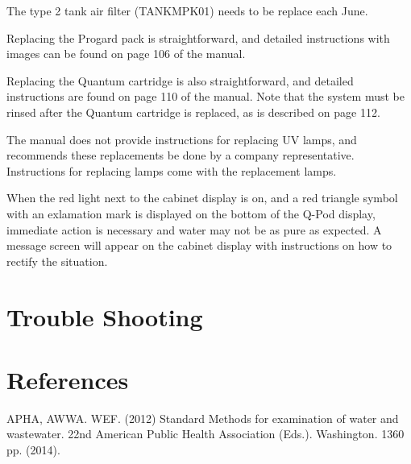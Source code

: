 \documentclass[12pt]{../SOP3_beta}\usepackage[]{graphicx}\usepackage[]{color}
\begin{document}
\NP The type 2 tank air filter (TANKMPK01) needs to be replace each June. 

\NP Replacing the Progard pack is straightforward, and detailed instructions with images can be found on page 106 of the manual. 

\NP Replacing the Quantum cartridge is also straightforward, and detailed instructions are found on page 110 of the manual. Note that the system must be rinsed after the Quantum cartridge is replaced, as is described on page 112. 

\NP The manual does not provide instructions for replacing UV lamps, and recommends these replacements be done by a company representative. Instructions for replacing lamps come with the replacement lamps.

\NP When the red light next to the cabinet display is on, and a red triangle symbol with an exlamation mark is displayed on the bottom of the Q-Pod display, immediate action is necessary and water may not be as pure as expected. A message screen will appear on the cabinet display with instructions on how to rectify the situation. 

\section{Trouble Shooting}

\section{References}

\NP APHA, AWWA. WEF. (2012) Standard Methods for examination of water and wastewater. 22nd American Public Health Association (Eds.). Washington. 1360 pp. (2014).
\end{document}
